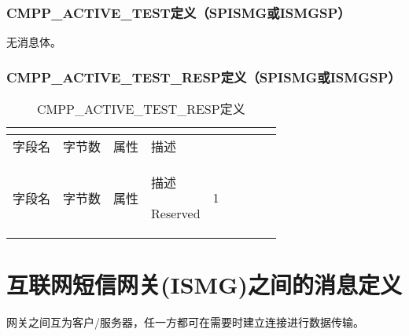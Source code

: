 \documentclass[11pt]{book} %
\begin{document}
\subsubsection{CMPP\_ACTIVE\_TEST定义（SP\textrightarrow ISMG或ISMG\textrightarrow SP）}

无消息体。
%
%
%
%
%



\subsubsection{CMPP\_ACTIVE\_TEST\_RESP定义（SP\textrightarrow ISMG或ISMG\textrightarrow SP）}


\begin{longtable}{|m{90pt}|m{35pt}|m{80pt}|m{200pt}|}
\tabularnewline\hline
字段名&字节数&属性&描述
\endhead

\caption{CMPP\_ACTIVE\_TEST\_RESP定义}\\
\hline
字段名&字节数&属性&描述
\endfirsthead

\endfoot

\endlastfoot

\hline
Reserved& 1& & \\
\hline
\end{longtable}



\section{互联网短信网关(ISMG)之间的消息定义}

网关之间互为客户/服务器，任一方都可在需要时建立连接进行数据传输。
%
%
%
%
%
\end{document}
